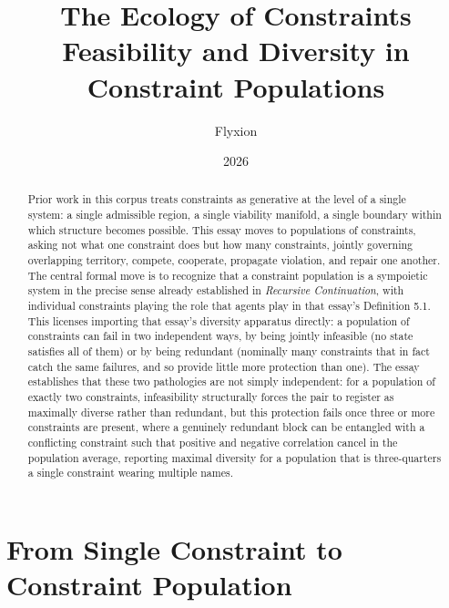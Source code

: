 \documentclass[11pt]{article}
\title{\textbf{The Ecology of Constraints}\\[4pt]
\large Feasibility and Diversity in Constraint Populations}
\author{Flyxion}
\date{2026}
\begin{document}
\maketitle

\begin{abstract}
Prior work in this corpus treats constraints as generative at the level of a single system: a single admissible region, a single viability manifold, a single boundary within which structure becomes possible. This essay moves to populations of constraints, asking not what one constraint does but how many constraints, jointly governing overlapping territory, compete, cooperate, propagate violation, and repair one another. The central formal move is to recognize that a constraint population is a sympoietic system in the precise sense already established in \emph{Recursive Continuation}, with individual constraints playing the role that agents play in that essay's Definition 5.1. This licenses importing that essay's diversity apparatus directly: a population of constraints can fail in two independent ways, by being jointly infeasible (no state satisfies all of them) or by being redundant (nominally many constraints that in fact catch the same failures, and so provide little more protection than one). The essay establishes that these two pathologies are not simply independent: for a population of exactly two constraints, infeasibility structurally forces the pair to register as maximally diverse rather than redundant, but this protection fails once three or more constraints are present, where a genuinely redundant block can be entangled with a conflicting constraint such that positive and negative correlation cancel in the population average, reporting maximal diversity for a population that is three-quarters a single constraint wearing multiple names.
\end{abstract}

\section{From Single Constraint to Constraint Population}
\end{document}
